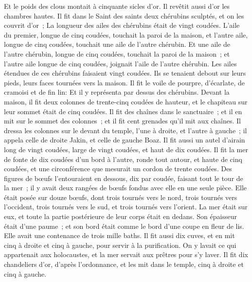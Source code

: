 \begin{multicols}{2}
Et le poids des clous montait à cinquante sicles d'or. Il revêtit aussi d'or les chambres hautes.
Il fit dans le Saint des saints deux chérubins sculptés, et on les couvrit d'or~;
La longueur des ailes des chérubins était de vingt coudées. L'aile du premier, longue de cinq coudées, touchait la paroi de la maison, et l'autre aile, longue de cinq coudées, touchait une aile de l'autre chérubin.
Et une aile de l'autre chérubin, longue de cinq coudées, touchait la paroi de la maison~; et l'autre aile longue de cinq coudées, joignait l'aile de l'autre chérubin.
Les ailes étendues de ces chérubins faisaient vingt coudées. Ils se tenaient debout sur leurs pieds, leurs faces tournées vers la maison.
Il fit le voile de pourpre, d'écarlate, de cramoisi et de fin lin: Et il y représenta par dessus des chérubins.
Devant la maison, il fit deux colonnes de trente-cinq coudées de hauteur, et le chapiteau sur leur sommet était de cinq coudées.
Il fit des chaînes dans le sanctuaire~; et il en mit sur le sommet des colonnes~; et il fit cent grenades qu'il mit aux chaînes.
Il dressa les colonnes sur le devant du temple, l'une à droite, et l'autre à gauche~; il appela celle de droite Jakin, et celle de gauche Boaz.
\VerseOne{}Il fit aussi un autel d'airain long de vingt coudées, large de vingt coudées, et haut de dix coudées.
Il fit la mer de fonte de dix coudées d'un bord à l'autre, ronde tout autour, et haute de cinq coudées, et une circonférence que mesurait un cordon de trente coudées.
Des figures de bœufs l'entouraient en dessous, dix par coudée, faisant tout le tour de la mer~; il y avait deux rangées de bœufs fondus avec elle en une seule pièce.
Elle était posée sur douze bœufs, dont trois tournés vers le nord, trois tournés vers l'occident, trois tournés vers le sud, et trois tournés vers l'orient. La mer était sur eux, et toute la partie postérieure de leur corps était en dedans.
Son épaisseur était d'une paume~; et son bord était comme le bord d'une coupe en fleur de lis. Elle avait une contenance de trois mille baths.
Il fit aussi dix cuves, et en mit cinq à droite et cinq à gauche, pour servir à la purification. On y lavait ce qui appartenait aux holocaustes, et la mer servait aux prêtres pour s'y laver.
Il fit dix chandeliers d'or, d'après l'ordonnance, et les mit dans le temple, cinq à droite et cinq à gauche.

\end{multicols}
